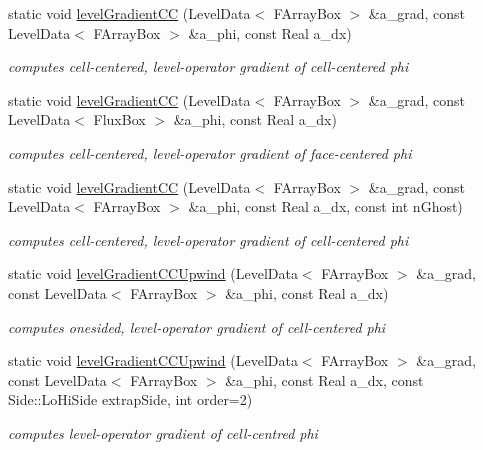 \begin{DoxyCompactItemize}
static void \hyperlink{class_gradient_a6103f7090b4d658cc1086f31a47474ba}{level\-Gradient\-C\-C} (Level\-Data$<$ F\-Array\-Box $>$ \&a\-\_\-grad, const Level\-Data$<$ F\-Array\-Box $>$ \&a\-\_\-phi, const Real a\-\_\-dx)
\begin{DoxyCompactList}\small\item\em computes cell-\/centered, level-\/operator gradient of cell-\/centered phi \end{DoxyCompactList}\item 
static void \hyperlink{class_gradient_a8962d5f7dabe25690dce34ce1c00726d}{level\-Gradient\-C\-C} (Level\-Data$<$ F\-Array\-Box $>$ \&a\-\_\-grad, const Level\-Data$<$ Flux\-Box $>$ \&a\-\_\-phi, const Real a\-\_\-dx)
\begin{DoxyCompactList}\small\item\em computes cell-\/centered, level-\/operator gradient of face-\/centered phi \end{DoxyCompactList}\item 
static void \hyperlink{class_gradient_a476a6adb3c37375c48b60d91a3c9c949}{level\-Gradient\-C\-C} (Level\-Data$<$ F\-Array\-Box $>$ \&a\-\_\-grad, const Level\-Data$<$ F\-Array\-Box $>$ \&a\-\_\-phi, const Real a\-\_\-dx, const int n\-Ghost)
\begin{DoxyCompactList}\small\item\em computes cell-\/centered, level-\/operator gradient of cell-\/centered phi \end{DoxyCompactList}\item 
static void \hyperlink{class_gradient_ab5fa9029705d216a3c1ae97b58bb970e}{level\-Gradient\-C\-C\-Upwind} (Level\-Data$<$ F\-Array\-Box $>$ \&a\-\_\-grad, const Level\-Data$<$ F\-Array\-Box $>$ \&a\-\_\-phi, const Real a\-\_\-dx)
\begin{DoxyCompactList}\small\item\em computes onesided, level-\/operator gradient of cell-\/centered phi \end{DoxyCompactList}\item 
static void \hyperlink{class_gradient_ab55b4c85431294e40707bd0bdae6e012}{level\-Gradient\-C\-C\-Upwind} (Level\-Data$<$ F\-Array\-Box $>$ \&a\-\_\-grad, const Level\-Data$<$ F\-Array\-Box $>$ \&a\-\_\-phi, const Real a\-\_\-dx, const Side\-::\-Lo\-Hi\-Side extrap\-Side, int order=2)
\begin{DoxyCompactList}\small\item\em computes level-\/operator gradient of cell-\/centred phi \end{DoxyCompactList}\item 

\end{DoxyCompactItemize}
